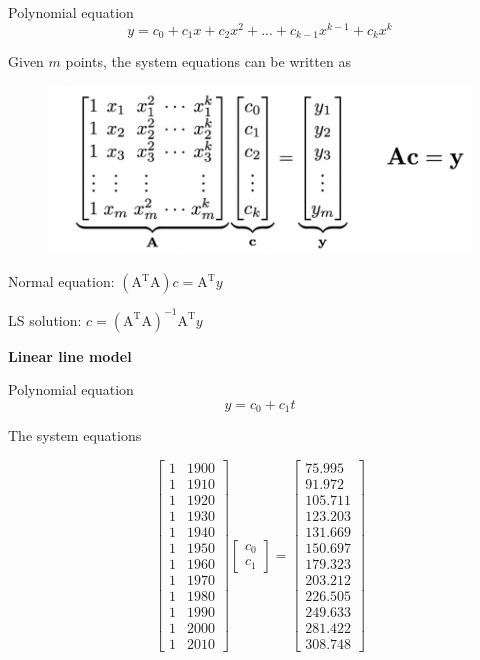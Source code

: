 \documentclass[conference]{IEEEtran}
\begin{document}
\begin{description}[font=$\bullet$~\normalfont\scshape\color{red!50!black}]
  \item Polynomial equation 
  \[ y = c_0 + c_1x + c_2x^2 + ... + c_{k-1}x^{k-1} + c_kx^k\]
  \item Given \( m \) points, the system equations can be written as
\begin{figure}[h!]
\centering
\includegraphics[width=1\linewidth]{images/equation.jpg}
\label{fig:equation}
\end{figure}
  \item Normal equation: \( (\mathrm{A}^\mathrm{T}\mathrm{A})c = \mathrm{A}^\mathrm{T}y\)
  \item LS solution: \( c = (\mathrm{A}^\mathrm{T}\mathrm{A})^{-1}\mathrm{A}^\mathrm{T}y\)
\end{description}

\textbf{Linear line model}

Polynomial equation 
\[ y = c_0 + c_1t \]

The system equations 

\[\begin{bmatrix}
1 & 1900\\
1 & 1910\\
1 & 1920\\
1 & 1930\\
1 & 1940\\
1 & 1950\\
1 & 1960\\
1 & 1970\\
1 & 1980\\
1 & 1990\\
1 & 2000\\
1 & 2010
\end{bmatrix}
\begin{bmatrix}
c_0 \\
c_1
\end{bmatrix} = 
\begin{bmatrix}
75.995\\
91.972\\
105.711\\
123.203\\
131.669\\
150.697\\
179.323\\
203.212\\
226.505\\
249.633\\
281.422\\
308.748
\end{bmatrix}\]
\end{document}
